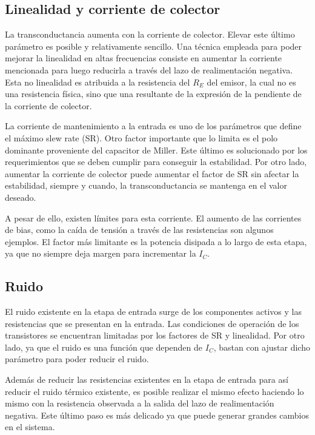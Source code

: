\subsection{Linealidad y corriente de colector}

La transconductancia aumenta con la corriente de colector. Elevar este último parámetro es posible y relativamente sencillo. Una técnica empleada para poder mejorar la linealidad en altas frecuencias consiste en aumentar la corriente mencionada para luego reducirla a través del lazo de realimentación negativa. Esta no linealidad es atribuida a la resistencia del $R_E$ del emisor, la cual no es una resistencia física, sino que una resultante de la expresión de la pendiente de la corriente de colector. 

La corriente de mantenimiento a la entrada es uno de los parámetros que define el máximo slew rate (SR). Otro factor importante que lo limita es el polo dominante proveniente del capacitor de Miller. Este último es solucionado por los requerimientos que se deben cumplir para conseguir la estabilidad. Por otro lado, aumentar la corriente de colector puede aumentar el factor de SR sin afectar la estabilidad, siempre y cuando, la transconductancia se mantenga en el valor deseado. 

A pesar de ello, existen límites para esta corriente. El aumento de las corrientes de bias, como la caída de tensión a través de las resistencias son algunos ejemplos. El factor más limitante es la potencia disipada a lo largo de esta etapa, ya que no siempre deja margen para incrementar la $I_C$. 

\subsection{Ruido}
El ruido existente en la etapa de entrada surge de los componentes activos y las resistencias que se presentan en la entrada. Las condiciones de operación de los transistores se encuentran limitadas por los factores de SR y linealidad. Por otro lado, ya que el ruido es una función que dependen de $I_C$, bastan con ajustar dicho parámetro para poder reducir el ruido. 

Además de reducir las resistencias existentes en la etapa de entrada para así reducir el ruido térmico existente, es posible realizar el mismo efecto haciendo lo mismo con la resistencia observada a la salida del lazo de realimentación negativa. Este último paso es más delicado ya que puede generar grandes cambios en el sistema.

